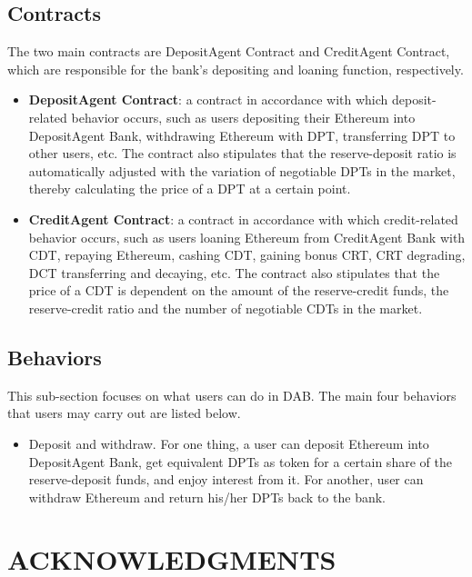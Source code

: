 \documentclass[a4paper, 10pt, conference]{ieeeconf} %
\begin{document}
\subsection{Contracts}
The two main contracts are DepositAgent Contract and CreditAgent Contract, which are responsible for the bank's depositing and loaning function, respectively.

\begin{itemize} 
   \item \textbf{DepositAgent Contract}: a contract in accordance with which deposit-related behavior occurs, such as users depositing their Ethereum into DepositAgent Bank, withdrawing Ethereum with DPT, transferring DPT to other users, etc. The contract also stipulates that the reserve-deposit ratio is automatically adjusted with the variation of negotiable DPTs in the market, thereby calculating the price of a DPT at a certain point.
   \item \textbf{CreditAgent Contract}: a contract in accordance with which credit-related behavior occurs, such as users loaning Ethereum from CreditAgent Bank with CDT, repaying Ethereum, cashing CDT, gaining bonus CRT, CRT degrading, DCT transferring and decaying, etc. The contract also stipulates that the price of a CDT is dependent on the amount of the reserve-credit funds, the reserve-credit ratio and the number of negotiable CDTs in the market.
\end{itemize}

\subsection{Behaviors}
This sub-section focuses on what users can do in DAB. The main four behaviors that users may carry out are listed below.

\begin{itemize}
   \item Deposit and withdraw. For one thing, a user can deposit Ethereum into DepositAgent Bank, get equivalent DPTs as token for a certain share of the reserve-deposit funds, and enjoy interest from it. For another, user can withdraw Ethereum and return his/her DPTs back to the bank.
\end{itemize}

\section*{ACKNOWLEDGMENTS}

%
%

%
\printbibliography
\end{document}
